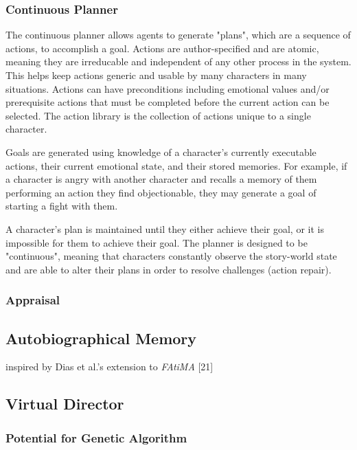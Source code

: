 \documentclass{sig-alternate-05-2015}
\begin{document}
\subsubsection{Continuous Planner}
\noindent The continuous planner allows agents to generate "plans", which are a sequence of actions, to accomplish a goal. Actions are author-specified and are atomic, meaning they are irreducable and independent of any other process in the system. This helps keep actions generic and usable by many characters in many situations. Actions can have preconditions including emotional values and/or prerequisite actions that must be completed before the current action can be selected. The action library is the collection of actions unique to a single character.

Goals are generated using knowledge of a character's currently executable actions, their current emotional state, and their stored memories. For example, if a character is angry with another character and recalls a memory of them performing an action they find objectionable, they may generate a goal of starting a fight with them.

A character's plan is maintained until they either achieve their goal, or it is impossible for them to achieve their goal. The planner is designed to be "continuous", meaning that characters constantly observe the story-world state and are able to alter their plans in order to resolve challenges (action repair).

\subsubsection{Appraisal}



\subsection{Autobiographical Memory}
\noindent inspired by Dias et al.'s extension to \textit{FAtiMA} [21]



\subsection{Virtual Director}

\subsubsection{Potential for Genetic Algorithm}
\end{document}
